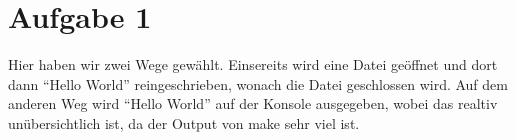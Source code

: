 \section*{Aufgabe 1}
Hier haben wir zwei Wege gewählt. 
Einsereits wird eine Datei geöffnet und dort dann \enquote{Hello World} reingeschrieben, wonach 
die Datei geschlossen wird.
Auf dem anderen Weg wird \enquote{Hello World} auf der Konsole ausgegeben, wobei das realtiv unübersichtlich ist,
da der Output von make sehr viel ist.